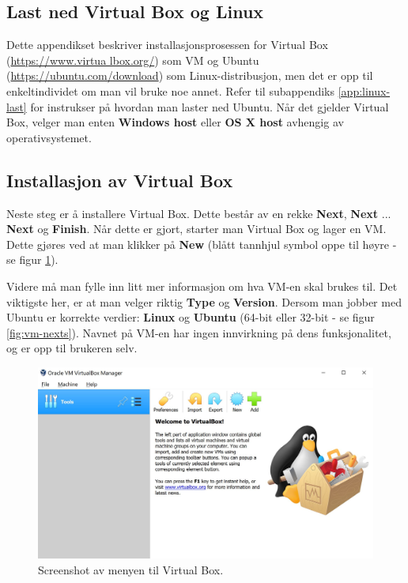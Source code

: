 \subsection{Last ned Virtual Box og Linux}
Dette appendikset beskriver installasjonsprosessen for Virtual Box (\href{https://www.virtualbox.org/}{https://www.virtua\newline
lbox.org/})  som VM og Ubuntu (\href{https://ubuntu.com/download}{https://ubuntu.com/download}) som Linux-distribusjon, men det er opp til enkeltindividet om man vil bruke noe annet. Refer til subappendiks \ref{app:linux-last} for instrukser på hvordan man laster ned Ubuntu. Når det gjelder Virtual Box, velger man enten \textbf{Windows host} eller \textbf{OS X host} avhengig av operativsystemet.


\subsection{Installasjon av Virtual Box}
Neste steg er å installere Virtual Box. Dette består av en rekke \textbf{Next}, \textbf{Next} ... \textbf{Next} og \textbf{Finish}. Når dette er gjort, starter man Virtual Box og lager en VM. Dette gjøres ved at man klikker på \textbf{New} (blått tannhjul symbol oppe til høyre - se figur \ref{fig:vm-forside}).

Videre må man fylle inn litt mer informasjon om hva VM-en skal brukes til. Det viktigste her, er at man velger riktig \textbf{Type} og \textbf{Version}. Dersom man jobber med Ubuntu er korrekte verdier: \textbf{Linux} og \textbf{Ubuntu} (64-bit eller 32-bit - se figur \ref{fig:vm-nexts}). Navnet på VM-en har ingen innvirkning på dens funksjonalitet, og er opp til brukeren selv. 


\begin{figure}[ht]
    \centering
    \includegraphics[scale = .63]{Main/figures/VM_forside.JPG}
    \caption{Screenshot av menyen til Virtual Box.}
    \label{fig:vm-forside}
\end{figure}

